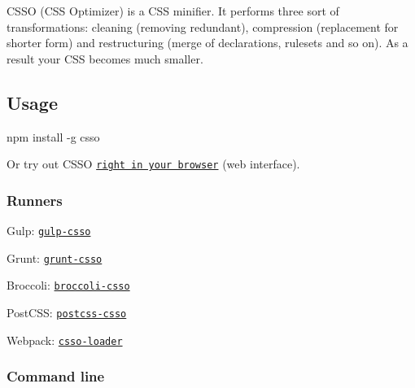 \href{https://www.npmjs.com/package/csso}{\tt } \href{https://travis-ci.org/css/csso}{\tt } \href{https://coveralls.io/github/css/csso?branch=master}{\tt } \href{https://www.npmjs.com/package/csso}{\tt } \href{https://twitter.com/cssoptimizer}{\tt }

C\+S\+SO (C\+SS Optimizer) is a C\+SS minifier. It performs three sort of transformations\+: cleaning (removing redundant), compression (replacement for shorter form) and restructuring (merge of declarations, rulesets and so on). As a result your C\+SS becomes much smaller.

\href{https://www.yandex.com/}{\tt } \href{https://www.avito.ru/}{\tt }

\subsection*{Usage}


\begin{DoxyCode}
npm install -g csso
\end{DoxyCode}


Or try out C\+S\+SO \href{http://css.github.io/csso/csso.html}{\tt right in your browser} (web interface).

\subsubsection*{Runners}


\begin{DoxyItemize}
\item Gulp\+: \href{https://github.com/ben-eb/gulp-csso}{\tt gulp-\/csso}
\item Grunt\+: \href{https://github.com/t32k/grunt-csso}{\tt grunt-\/csso}
\item Broccoli\+: \href{https://github.com/sindresorhus/broccoli-csso}{\tt broccoli-\/csso}
\item Post\+C\+SS\+: \href{https://github.com/lahmatiy/postcss-csso}{\tt postcss-\/csso}
\item Webpack\+: \href{https://github.com/sandark7/csso-loader}{\tt csso-\/loader}
\end{DoxyItemize}

\subsubsection*{Command line}


